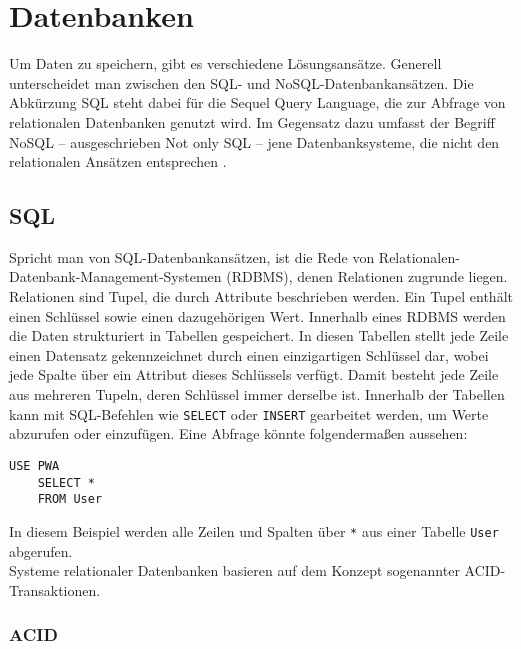 \chapter{Datenbanken}\label{mongo}

Um Daten zu speichern, gibt es verschiedene Lösungsansätze. Generell unterscheidet man zwischen den SQL- und NoSQL-Datenbankansätzen. Die Abkürzung \glqq SQL\grqq{} steht dabei für die \glqq Sequel Query Language\grqq{}, die zur Abfrage von relationalen Datenbanken genutzt wird. Im Gegensatz dazu umfasst der Begriff \glqq NoSQL\grqq{} – ausgeschrieben \glqq Not only SQL\grqq{} – jene Datenbanksysteme, die nicht den relationalen Ansätzen entsprechen \cite{eins}.

\section{SQL}
Spricht man von SQL-Datenbankansätzen, ist die Rede von Relationalen-Datenbank-Management-Systemen (RDBMS), denen Relationen zugrunde liegen. Relationen sind Tupel, die durch Attribute beschrieben werden. Ein Tupel enthält einen Schlüssel sowie einen dazugehörigen Wert.
Innerhalb eines RDBMS werden die Daten strukturiert in Tabellen gespeichert. In diesen Tabellen stellt jede Zeile einen Datensatz gekennzeichnet durch einen einzigartigen Schlüssel dar, wobei jede Spalte über ein Attribut dieses Schlüssels verfügt. Damit besteht jede Zeile aus mehreren Tupeln, deren Schlüssel immer derselbe ist. Innerhalb der Tabellen kann mit SQL-Befehlen wie \texttt{SELECT} oder \texttt{INSERT} gearbeitet werden, um Werte abzurufen oder einzufügen. Eine Abfrage könnte folgendermaßen aussehen:

\begin{lstlisting}[caption=SQL SELECT-Abfrage, label=lst:selectabfrage,float=!htb]
    USE PWA
    SELECT *
    FROM User
\end{lstlisting}    
    
In diesem Beispiel werden alle Zeilen und Spalten über \texttt{*} aus einer Tabelle \texttt{User} abgerufen.\\

Systeme relationaler Datenbanken basieren auf dem Konzept sogenannter ACID-Transaktionen.

\subsection{ACID}

